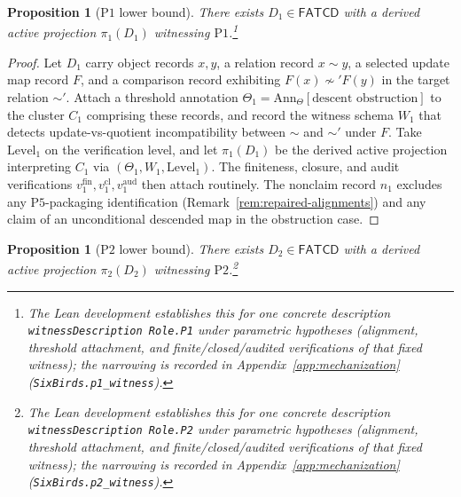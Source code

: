 \documentclass[11pt]{article}
\newtheorem{proposition}[theorem]{Proposition}
\theoremstyle{definition}
\newcommand{\FATCD}{\ensuremath{\mathsf{FATCD}}}
\newcommand{\Pone}{\ensuremath{\mathrm{P1}}}
\newcommand{\Ptwo}{\ensuremath{\mathrm{P2}}}
\newcommand{\Pfive}{\ensuremath{\mathrm{P5}}}
\begin{document}
\begin{proposition}[\Pone{} lower bound]\label{prop:p1-witness}
There exists \(D_1 \in \FATCD{}\) with a derived active projection
\(\pi_1(D_1)\) witnessing \Pone{}.\footnote{The Lean development establishes this for one concrete description \texttt{witnessDescription Role.P1} under parametric hypotheses (alignment, threshold attachment, and finite/closed/audited verifications of that fixed witness); the narrowing is recorded in Appendix~\ref{app:mechanization} (\texttt{SixBirds.p1\_witness}).}
\end{proposition}

\begin{proof}
Let \(D_1\) carry object records \(x, y\), a relation record
\(x \sim y\), a selected update map record \(F\), and a comparison
record exhibiting \(F(x) \not\sim' F(y)\) in the target relation
\(\sim'\). Attach a threshold annotation
\(\Theta_1 = \mathrm{Ann}_\Theta[\text{descent obstruction}]\) to the
cluster \(C_1\) comprising these records, and record the witness schema
\(W_1\) that detects update-vs-quotient incompatibility between \(\sim\)
and \(\sim'\) under \(F\). Take \(\mathrm{Level}_1\) on the verification
level, and let \(\pi_1(D_1)\) be the derived active projection
interpreting \(C_1\) via \((\Theta_1,W_1,\mathrm{Level}_1)\). The
finiteness, closure, and audit verifications \(v_1^{\mathrm{fin}},
v_1^{\mathrm{cl}}, v_1^{\mathrm{aud}}\) then attach routinely. The
nonclaim record \(n_1\) excludes any \Pfive{}-packaging
identification (Remark~\ref{rem:repaired-alignments}) and any claim of
an unconditional descended map in the obstruction case.
\end{proof}

\begin{proposition}[\Ptwo{} lower bound]\label{prop:p2-witness}
There exists \(D_2 \in \FATCD{}\) with a derived active projection
\(\pi_2(D_2)\) witnessing \Ptwo{}.\footnote{The Lean development establishes this for one concrete description \texttt{witnessDescription Role.P2} under parametric hypotheses (alignment, threshold attachment, and finite/closed/audited verifications of that fixed witness); the narrowing is recorded in Appendix~\ref{app:mechanization} (\texttt{SixBirds.p2\_witness}).}
\end{proposition}
\end{document}

